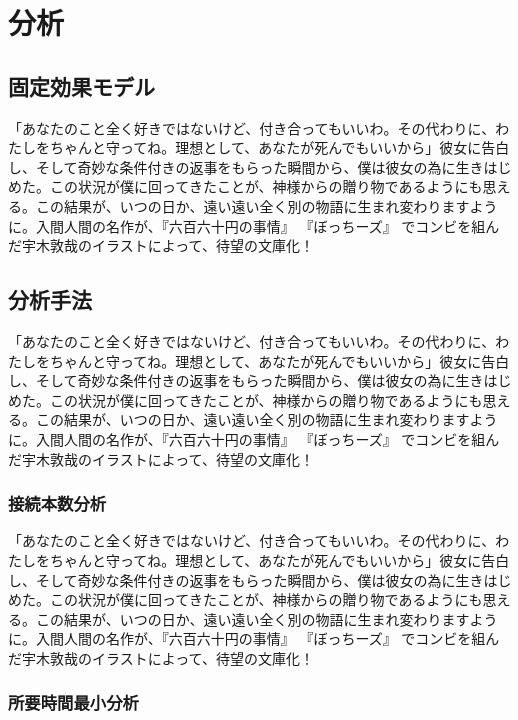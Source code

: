 \chapter{分析}

\section{固定効果モデル}

「あなたのこと全く好きではないけど、付き合ってもいいわ。その代わりに、わたしをちゃんと守ってね。理想として、あなたが死んでもいいから」彼女に告白し、そして奇妙な条件付きの返事をもらった瞬間から、僕は彼女の為に生きはじめた。この状況が僕に回ってきたことが、神様からの贈り物であるようにも思える。この結果が、いつの日か、遠い遠い全く別の物語に生まれ変わりますように。入間人間の名作が、『六百六十円の事情』 『ぼっちーズ』 でコンビを組んだ宇木敦哉のイラストによって、待望の文庫化！

\section{分析手法}

「あなたのこと全く好きではないけど、付き合ってもいいわ。その代わりに、わたしをちゃんと守ってね。理想として、あなたが死んでもいいから」彼女に告白し、そして奇妙な条件付きの返事をもらった瞬間から、僕は彼女の為に生きはじめた。この状況が僕に回ってきたことが、神様からの贈り物であるようにも思える。この結果が、いつの日か、遠い遠い全く別の物語に生まれ変わりますように。入間人間の名作が、『六百六十円の事情』 『ぼっちーズ』 でコンビを組んだ宇木敦哉のイラストによって、待望の文庫化！

\subsection{接続本数分析}

「あなたのこと全く好きではないけど、付き合ってもいいわ。その代わりに、わたしをちゃんと守ってね。理想として、あなたが死んでもいいから」彼女に告白し、そして奇妙な条件付きの返事をもらった瞬間から、僕は彼女の為に生きはじめた。この状況が僕に回ってきたことが、神様からの贈り物であるようにも思える。この結果が、いつの日か、遠い遠い全く別の物語に生まれ変わりますように。入間人間の名作が、『六百六十円の事情』 『ぼっちーズ』 でコンビを組んだ宇木敦哉のイラストによって、待望の文庫化！

\subsection{所要時間最小分析}

